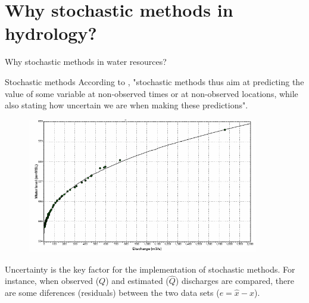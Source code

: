 \documentclass[8pt]{beamer}
\begin{document}
\section{Why stochastic methods in hydrology?}
\begin{frame}{Why stochastic methods in water resources?}

    \begin{block}{Stochastic methods}
    According to \cite{}, "stochastic methods thus aim at predicting the value of some variable at non-observed times or at non-observed locations, while also stating how uncertain we are when making these predictions".
    \begin{figure}
    \centering
    \includegraphics[width=0.9\textwidth]{fi1l1.png}
    \end{figure}
    \alert{Uncertainty} is the key factor for the implementation of stochastic methods.  For instance, when observed ($Q$) and estimated ($\hat{Q}$) discharges are compared, there are some diferences (\alert{residuals}) between the two data sets ($e = \hat{x}-x$). 
\end{block}
\end{frame}
\end{document}
